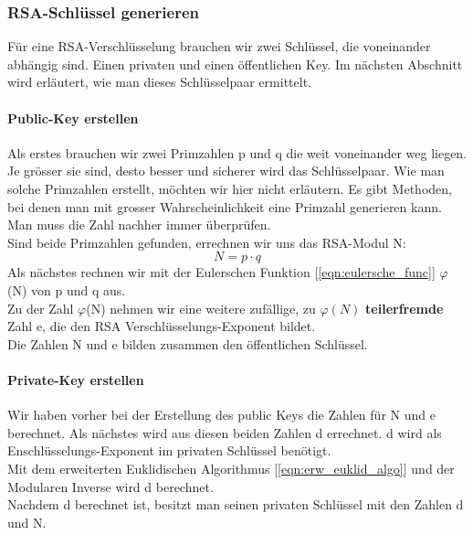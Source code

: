\subsubsection{RSA-Schlüssel generieren}
Für eine RSA-Verschlüsselung brauchen wir zwei Schlüssel, die voneinander abhängig sind. Einen privaten und einen öffentlichen Key. Im nächsten Abschnitt wird erläutert, wie man dieses Schlüsselpaar ermittelt.%
%
\paragraph{Public-Key erstellen}\label{sec:public_key}
Als erstes brauchen wir zwei Primzahlen p und q die weit voneinander weg liegen. Je grösser sie sind, desto besser und sicherer wird das Schlüsselpaar. Wie man solche Primzahlen erstellt, möchten wir hier nicht erläutern. Es gibt Methoden, bei denen man mit grosser Wahrscheinlichkeit eine Primzahl generieren kann. Man muss die Zahl nachher immer überprüfen.\\
Sind beide Primzahlen gefunden, errechnen wir uns das RSA-Modul N: %
%
\begin{equation}
  N = p \cdot q
  \label{eqn:rsa_modul}
\end{equation}
%
Als nächstes rechnen wir mit der Eulerschen Funktion [\ref{eqn:eulersche_func}] $\varphi$(N) von p und q aus.\\
Zu der Zahl $\varphi$(N) nehmen wir eine weitere zufällige, zu $\varphi(N)$ \textbf{teilerfremde} Zahl e, die den RSA Verschlüsselungs-Exponent bildet.\\
Die Zahlen N und e bilden zusammen den öffentlichen Schlüssel.
\paragraph{Private-Key erstellen}
Wir haben vorher bei der Erstellung des public Keys die Zahlen für N und e berechnet. Als nächstes wird aus diesen beiden Zahlen d errechnet. d wird als Enschlüsselungs-Exponent im privaten Schlüssel benötigt.\\
Mit dem erweiterten Euklidischen Algorithmus [\ref{eqn:erw_euklid_algo}] und der Modularen Inverse wird d berechnet.\\
%
%
Nachdem d berechnet ist, besitzt man seinen privaten Schlüssel mit den Zahlen d und N.
